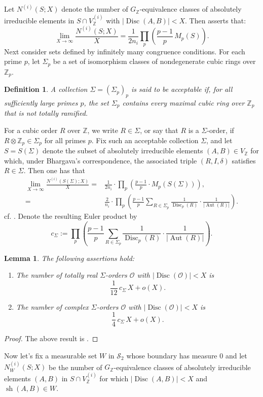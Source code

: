\documentclass[table]{amsart}
\newtheorem{lemma}[theorem]{Lemma}
\newtheorem{definition}[theorem]{Definition}
\newcommand{\Z}{\mathbb{Z}}
\newcommand{\op}[1]{\operatorname{#1}}
\numberwithin{equation}{section}
\begin{document}
Let $N^{(i)}(S;X)$ denote the number of $G_{\mathbb{Z}}$-equivalence classes of
absolutely irreducible elements in $S \cap V_{\mathbb{Z}}^{(i)}$ with
$|\operatorname{Disc}(A,B)|<X$. Then \cite[Theorem 19]{BhargavaVarma} asserts that:
\[
\lim_{X\to\infty} \frac{N^{(i)}(S;X)}{X}
=
\frac{1}{2n_i}
\prod_p \left(\frac{p-1}{p}\, M_p(S)\right).
\]
Next consider sets defined by infinitely many congruence conditions. For each prime \(p\), let \(\Sigma_p\) be a set of isomorphism
classes of nondegenerate cubic rings over \(\mathbb{Z}_p\). 

\begin{definition}\label{acceptable Sigma}A collection
\(\Sigma=(\Sigma_p)_p\) is said to be \emph{acceptable} if, for all sufficiently
large primes \(p\), the set \(\Sigma_p\) contains every maximal cubic ring over
\(\mathbb{Z}_p\) that is not totally ramified.
\end{definition}
For a cubic order \(R\) over
\(\mathbb{Z}\), we write \(R\in\Sigma\), or say that \(R\) is a \(\Sigma\)-order,
if \(R\otimes\mathbb{Z}_p\in\Sigma_p\) for all primes \(p\). Fix such an acceptable collection \(\Sigma\), and let \(S=S(\Sigma)\) denote the
subset of absolutely irreducible elements \((A,B)\in V_{\mathbb{Z}}\) for which,
under Bhargava’s correspondence, the associated triple \((R,I,\delta)\) satisfies
\(R\in\Sigma\). Then one has that
\[
\begin{split}\lim_{X\to\infty}
\frac{N^{(i)}(S(\Sigma);X)}{X}
=&
\frac{1}{2n_i}
\cdot
\prod_p
\left(
\frac{p-1}{p}\cdot M_p(S(\Sigma))
\right),\\
=&\frac{2}{n_i}
\cdot
\prod_p
\left(
\frac{p-1}{p}
\sum_{R\in\Sigma_p}
\frac{1}{\op{Disc}_p(R)}
\cdot
\frac{1}{\lvert\op{Aut}(R)\rvert}
\right).
\end{split}
\]
cf. \cite[(12)]{BhargavaVarma}. Denote the resulting Euler product by
\[
c_\Sigma
:=
\prod_p
\left(
\frac{p-1}{p}
\sum_{R\in\Sigma_p}
\frac{1}{\op{Disc}_p(R)}
\cdot
\frac{1}{\lvert\op{Aut}(R)\rvert}
\right).
\]

\begin{lemma}\label{lemma 4.2}
The following assertions hold:
\begin{enumerate}
\item
The number of totally real \(\Sigma\)-orders \(\mathcal{O}\) with
\(\lvert\op{Disc}(\mathcal{O})\rvert<X\) is
\[
\frac{1}{12}\,c_\Sigma\,X + o(X).
\]
\item
The number of complex \(\Sigma\)-orders \(\mathcal{O}\) with
\(\lvert\op{Disc}(\mathcal{O})\rvert<X\) is
\[
\frac{1}{4}\,c_\Sigma\,X + o(X).
\]
\end{enumerate}
\end{lemma}
\begin{proof}
    The above result is \cite[Lemma 23]{BhargavaVarma}.
\end{proof}
\par Now let's fix a measurable set $W$ in $\mathcal{S}_2$ whose boundary has measure $0$ and let $N^{(i)}_W(S;X) $ be the number of $G_{\Z}$-equivalence classes of absolutely irreducible elements $(A,B)$ in $S\cap V_{\Z}^{(i)}$ for which $|\op{Disc}(A,B)|<X$ and $\op{sh}(A,B)\in W$.
\end{document}
